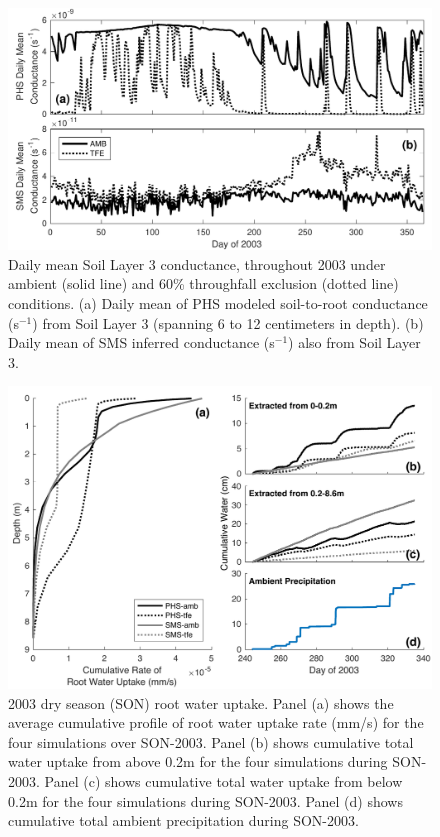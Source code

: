 \documentclass[draft,linenumbers]{agujournal}
\begin{document}
  \clearpage   
  \begin{figure}[h]
     \centering
     \includegraphics[width=30pc]{../figs2/fig6a.pdf}
     \caption{Daily mean Soil Layer 3 conductance, throughout 2003 under ambient (solid line) and 60\% throughfall exclusion (dotted line) conditions.
     (a) Daily mean of PHS modeled soil-to-root conductance (s$^{-1}$) from Soil Layer 3 (spanning 6 to 12 centimeters in depth).
     (b) Daily mean of SMS inferred conductance (s$^{-1}$) also from Soil Layer 3.
     }
     \label{fig:cond2}
  \end{figure}
  
        \clearpage
    \begin{figure}[h]
     \centering
     \includegraphics[width=30pc]{../figs2/fig7.pdf}
     \caption{2003 dry season (SON) root water uptake. 
     Panel (a) shows the average cumulative profile of root water uptake rate (mm/s) for the four simulations over SON-2003.
     Panel (b) shows cumulative total  water uptake from above 0.2m for the four simulations during SON-2003.
     Panel (c) shows cumulative total water uptake from below 0.2m for the four simulations during SON-2003. 
     Panel (d) shows cumulative total ambient precipitation during SON-2003.
     }
     \label{fig7}
  \end{figure}
  
\end{document}

